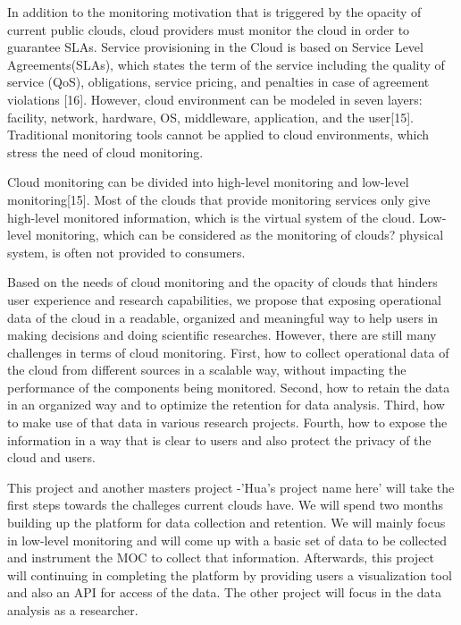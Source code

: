   In addition to the monitoring motivation that is triggered by the opacity of current public clouds, cloud providers must monitor the cloud in order to guarantee SLAs. Service provisioning in the Cloud is based on Service Level Agreements(SLAs), which states the term of the service including the quality of service (QoS), obligations, service pricing, and penalties in case of agreement violations [16]. However, cloud environment can be modeled in seven layers: facility, network, hardware, OS, middleware, application, and the user[15]. Traditional monitoring tools cannot be applied to cloud environments, which stress the need of cloud monitoring.

  Cloud monitoring can be divided into high-level monitoring and low-level monitoring[15]. Most of the clouds that provide monitoring services only give high-level monitored information, which is the virtual system of the cloud. Low-level monitoring, which can be considered as the monitoring of clouds? physical system, is often not provided to consumers. 

  Based on the needs of cloud monitoring and the opacity of clouds that hinders user experience and research capabilities, we propose that exposing operational data of the cloud in a readable, organized and meaningful way to help users in making decisions and doing scientific researches. However, there are still many challenges in terms of cloud monitoring. First, how to collect operational data of the cloud from different sources in a scalable way, without impacting the performance of the components being monitored. Second, how to retain the data in an organized way and to optimize the retention for data analysis. Third, how to make use of that data in various research projects. Fourth, how to expose the information in a way that is clear to users and also protect the privacy of the cloud and users. 


  This project and another masters project -'Hua's project name here' will take the first steps towards the challeges current clouds have. We will spend two months building up the platform for data collection and retention. We will mainly focus in low-level monitoring and will come up with a basic set of data to be collected and instrument the MOC to collect that information. Afterwards, this project will continuing in completing the platform by providing users a visualization tool and also an API for access of the data. The other project will focus in the data analysis as a researcher.